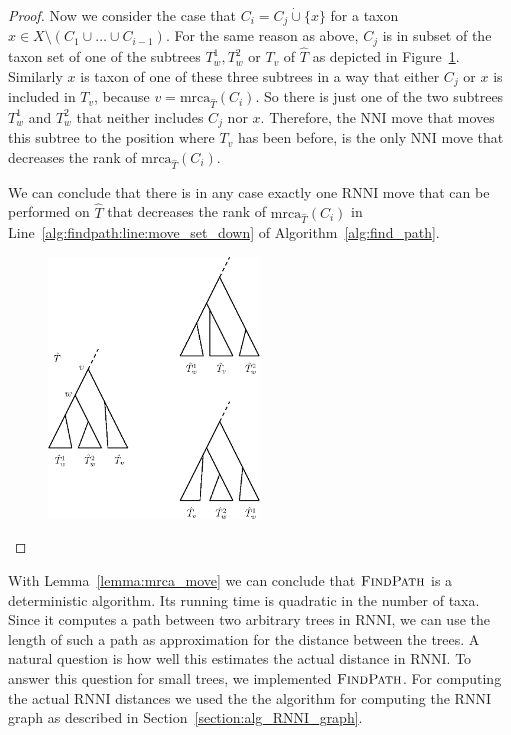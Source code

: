 \documentclass{amsart}
\newcommand{\mrca}{\mathrm{mrca}}
\newcommand{\nni}{\mathrm{NNI}}
\newcommand{\rnni}{\mathrm{RNNI}}
\newcommand{\findpath}{\textsc{FindPath}}
\begin{document}
\begin{proof}
    Now we consider the case that $C_i = C_j \dot\cup \{x\}$ for a taxon $x \in X \setminus (C_1 \cup \ldots \cup C_{i-1})$.
    For the same reason as above, $C_j$ is in subset of the taxon set of one of the subtrees $T_w^1, T_w^2$ or $T_v$ of $\hat T$ as depicted in Figure~\ref{fig:mrca_move}.
    Similarly $x$ is taxon of one of these three subtrees in a way that either $C_j$ or $x$ is included in $T_v$, because $v = \mrca_{\hat T}(C_i)$.
    So there is just one of the two subtrees $T_w^1$ and $T_w^2$ that neither includes $C_j$ nor $x$.
    Therefore, the $\nni$ move that moves this subtree to the position where $T_v$ has been before, is the only $\nni$ move that decreases the rank of $\mrca_{\hat T}(C_i)$.

    We can conclude that there is in any case exactly one $\rnni$ move that can be performed on $\hat T$ that decreases the rank of $\mrca_{\hat T}(C_i)$ in Line~\ref{alg:findpath:line:move_set_down} of Algorithm~\ref{alg:find_path}.

    \begin{figure}[H]
    	\centering
    	\includegraphics[width=0.5\textwidth]{mrca_move}
        \vspace{2pt}
    	\caption{}
    	\label{fig:mrca_move}
    \end{figure}

\end{proof}

With Lemma~\ref{lemma:mrca_move} we can conclude that $\findpath$ is a deterministic algorithm.
Its running time is quadratic in the number of taxa.
Since it computes a path between two arbitrary trees in $\rnni$, we can use the length of such a path as approximation for the distance between the trees.
A natural question is how well this estimates the actual distance in $\rnni$.
To answer this question for small trees, we implemented $\findpath$.
For computing the actual $\rnni$ distances we used the the algorithm for computing the $\rnni$ graph as described in Section~\ref{section:alg_RNNI_graph}.
\end{document}
